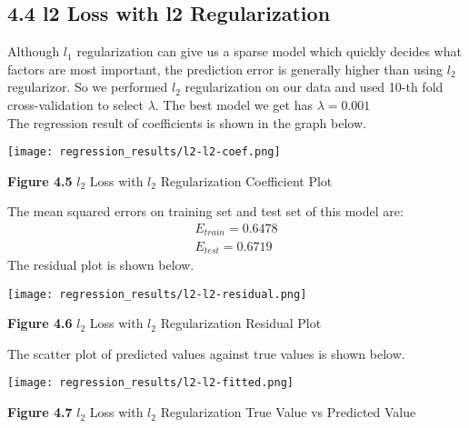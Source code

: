 \documentclass[9pt,twocolumn,twoside]{pnas-new}
\begin{document}





\subsection*{4.4 l2 Loss with l2 Regularization}
Although $l_{1}$ regularization can give us a sparse model which quickly decides what factors are most important, the prediction error is generally higher than using $l_{2}$ regularizor. So we performed $l_{2}$ regularization on our data and used 10-th fold cross-validation to select $\lambda$.  The best model we get has  $\lambda = 0.001$\\
The regression result of coefficients is shown in the graph below.

\texttt{[image: regression\_results/l2-l2-coef.png]} 
\begin{center}
\textbf{Figure 4.5} $l_{2}$ Loss with $l_{2}$ Regularization Coefficient Plot
\end{center}

\noindent The mean squared errors on training set and test set of this model are:
\begin{align*}
E_{train} = 0.6478\\
E_{test} = 0.6719
\end{align*}
The residual plot is shown below.

\texttt{[image: regression\_results/l2-l2-residual.png]} 
\begin{center}
\textbf{Figure 4.6}  $l_{2}$ Loss with $l_{2}$ Regularization Residual Plot
\end{center}

\noindent The scatter plot of predicted values against true values is shown below.

\texttt{[image: regression\_results/l2-l2-fitted.png]}
\begin{center}
\textbf{Figure 4.7}  $l_{2}$ Loss with $l_{2}$ Regularization True Value vs Predicted Value
\end{center}
\end{document}
